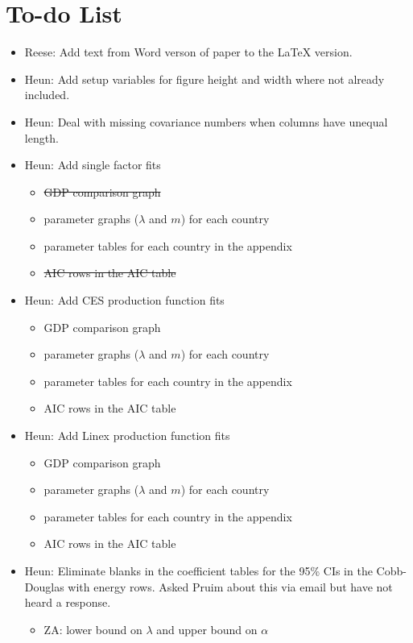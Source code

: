 \documentclass[preprint,authoryear,12pt]{elsarticle}\usepackage{graphicx, color}
\begin{document}
\section*{To-do List}
\begin{itemize}
\item Reese: Add text from Word verson of paper to the LaTeX version.
\item Heun: Add setup variables for figure height and width where not already included.
\item Heun: Deal with missing covariance numbers when columns have unequal length.
\item Heun: Add single factor fits
      \begin{itemize}
      \item \st{GDP comparison graph}
      \item parameter graphs ($\lambda$ and $m$) for each country
      \item parameter tables for each country in the appendix
      \item \st{AIC rows in the AIC table}
      \end{itemize}
\item Heun: Add CES production function fits
      \begin{itemize}
      \item GDP comparison graph
      \item parameter graphs ($\lambda$ and $m$) for each country
      \item parameter tables for each country in the appendix
      \item AIC rows in the AIC table
      \end{itemize}
\item Heun: Add Linex production function fits
      \begin{itemize}
      \item GDP comparison graph
      \item parameter graphs ($\lambda$ and $m$) for each country
      \item parameter tables for each country in the appendix
      \item AIC rows in the AIC table
      \end{itemize}
\item Heun: Eliminate blanks in the coefficient tables for the 95\% CIs in the Cobb-Douglas with energy rows. Asked Pruim about this via email but have not heard a response.
      \begin{itemize}
      \item ZA: lower bound on $\lambda$ and upper bound on $\alpha$

\end{itemize}
\end{itemize}
\end{document}
